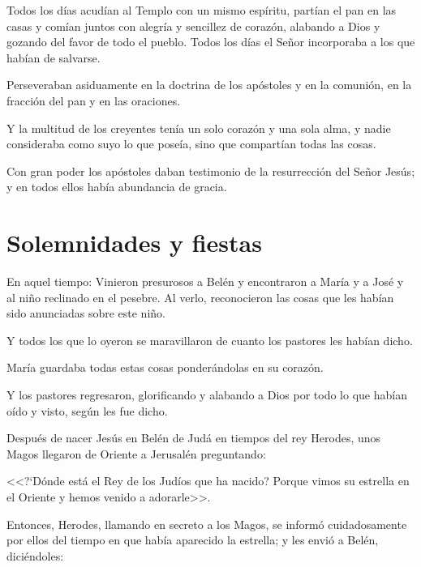 Todos los días 
acudían al Templo con un mismo espíritu, 
partían el pan en las casas y comían juntos con 
alegría y sencillez de corazón, alabando a Dios 
y gozando del favor de todo el pueblo. Todos 
los días el Señor incorporaba a los que habían 
de salvarse. 


 Perseveraban asiduamente en la doctrina de 
los apóstoles y en la comunión, en la fracción 
del pan y en las oraciones. 

Y la multitud de los 
creyentes tenía un solo corazón y una sola 
alma, y nadie consideraba como suyo lo que 
poseía, sino que compartían todas las cosas. 

Con gran poder los apóstoles daban 
testimonio de la resurrección del Señor Jesús; y 
en todos ellos había abundancia de gracia. 

\newpage
\section{Solemnidades y fiestas}



 En aquel tiempo: Vinieron presurosos a Belén 
y encontraron a María y a José y al niño 
reclinado en el pesebre. Al verlo, reconocieron 
las cosas que les habían sido anunciadas sobre 
este niño.

 Y todos los que lo oyeron se 
maravillaron de cuanto los pastores les habían 
dicho. 

María guardaba todas estas cosas 
ponderándolas en su corazón. 

Y los pastores 
regresaron, glorificando y alabando a Dios por 
todo lo que habían oído y visto, según les fue 
dicho. 





 Después de nacer Jesús en Belén de Judá en 
tiempos del rey Herodes, unos Magos llegaron 
de Oriente a Jerusalén preguntando:

 <<?`Dónde 
está el Rey de los Judíos que ha nacido? 
Porque vimos su estrella en el Oriente y hemos 
venido a adorarle>>. 

Entonces, Herodes, 
llamando en secreto a los Magos, se informó 
cuidadosamente por ellos del tiempo en que 
había aparecido la estrella; y les envió a Belén, 
diciéndoles: 

